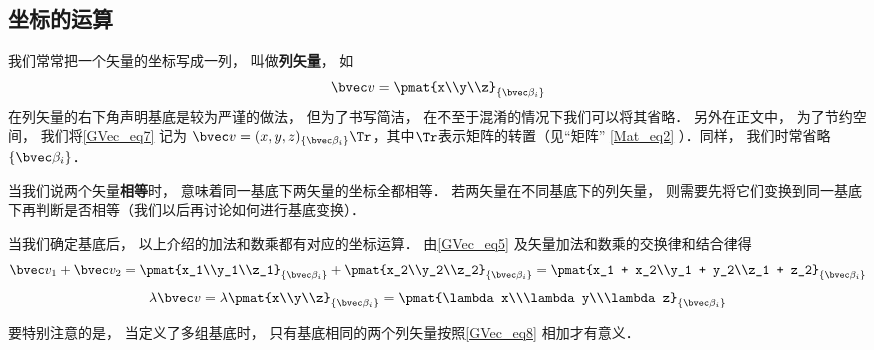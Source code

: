 \subsection{坐标的运算}
我们常常把一个矢量的坐标写成一列， 叫做\textbf{列矢量}， 如
\begin{equation}\label{GVec_eq7}
\bvec v = \pmat{x\\y\\z}_{\{\bvec\beta_i\}}
\end{equation}
在列矢量的右下角声明基底是较为严谨的做法， 但为了书写简洁， 在不至于混淆的情况下我们可以将其省略． 另外在正文中， 为了节约空间， 我们将\autoref{GVec_eq7} 记为 $\bvec v = (x, y, z)_{\{\bvec\beta_i\}}\Tr$，其中$\Tr$表示矩阵的转置（见“矩阵” \autoref{Mat_eq2} ）．同样， 我们时常省略 $\{\bvec\beta_i\}$．

当我们说两个矢量\textbf{相等}时， 意味着同一基底下两矢量的坐标全都相等． 若两矢量在不同基底下的列矢量， 则需要先将它们变换到同一基底下再判断是否相等（我们以后再讨论如何进行基底变换）．

当我们确定基底后， 以上介绍的加法和数乘都有对应的坐标运算． 由\autoref{GVec_eq5} 及矢量加法和数乘的交换律和结合律得
\begin{equation}\label{GVec_eq8}
\bvec v_1 + \bvec v_2 = \pmat{x_1\\y_1\\z_1}_{\{\bvec\beta_i\}} + \pmat{x_2\\y_2\\z_2}_{\{\bvec\beta_i\}} = \pmat{x_1 + x_2\\y_1 + y_2\\z_1 + z_2}_{\{\bvec\beta_i\}}
\end{equation}
\begin{equation}\label{GVec_eq9}
\lambda \bvec v = \lambda\pmat{x\\y\\z}_{\{\bvec\beta_i\}} = \pmat{\lambda x\\\lambda y\\\lambda z}_{\{\bvec\beta_i\}}
\end{equation}

要特别注意的是， 当定义了多组基底时， 只有基底相同的两个列矢量按照\autoref{GVec_eq8} 相加才有意义．


